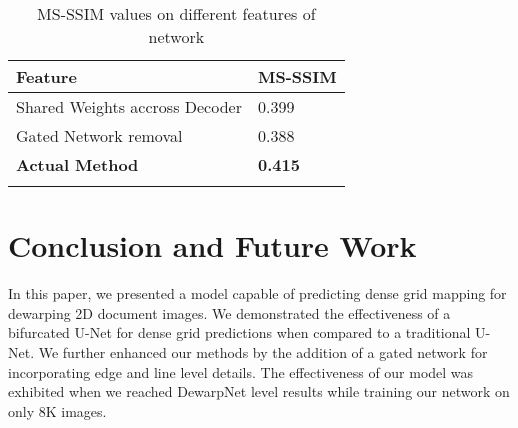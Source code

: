 \documentclass[a4paper,conference]{IEEEtran}
\begin{document}
                                                                                                                                                                                                                                                                                                                                                                                                                                                                                                                                                                                                                                                                                                                                                                                                                                                                                                                                                                                                                                                                                                                                                                                                                                                                	\begin{table}[h]
	\centering 
	\caption{MS-SSIM values on different features of network\label{tab:techniques}}
	\begin{tabular*}{\linewidth}{p{150pt}p{40pt}}    \toprule
		\textbf{Feature} & \textbf{MS-SSIM}\\\midrule
		  Shared Weights accross Decoder&0.399\\
		 Gated Network removal &0.388\\
		 \textbf{Actual Method} &\textbf{0.415}\\
		 
		\hline
	\label{table:tab3}
	\end{tabular*}

\end{table} 	
	
	\section{Conclusion and Future Work}
	In this paper, we presented a model capable of predicting dense grid mapping for dewarping 2D document images. We demonstrated the effectiveness of a bifurcated U-Net for dense grid predictions when compared to a traditional U-Net. We further enhanced our methods by the addition of a gated network for incorporating edge and line level details. The effectiveness of our model was exhibited when we reached DewarpNet level results while training our network on only 8K images.
	\\
	
\end{document}
